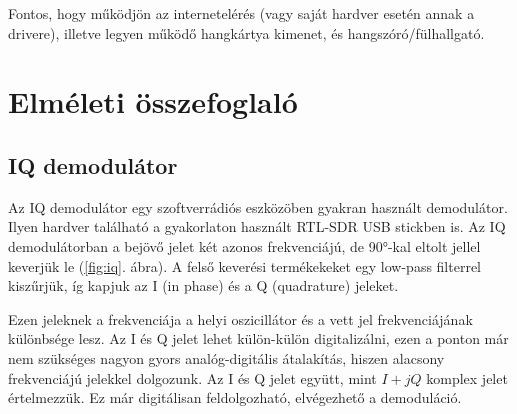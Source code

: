\documentclass[12pt,a4paper]{article}
\begin{document}
Fontos, hogy működjön az internetelérés (vagy saját hardver esetén annak a drivere), illetve legyen működő hangkártya kimenet, és hangszóró/fülhallgató.

\section{Elméleti összefoglaló}


\subsection{IQ demodulátor}
Az IQ demodulátor egy szoftverrádiós eszközöben gyakran használt demodulátor.
Ilyen hardver található a gyakorlaton használt RTL-SDR USB stickben is.
Az IQ demodulátorban a bejövő jelet két azonos frekvenciájú, de 90°-kal eltolt jellel keverjük le (\ref{fig:iq}. ábra). 
A felső keverési termékekeket egy low-pass filterrel kiszűrjük, íg kapjuk az I (in phase) és a Q (quadrature) jeleket.

Ezen jeleknek a frekvenciája a helyi oszicillátor és a vett jel frekvenciájának különbsége lesz.
Az I és Q jelet lehet külön-külön digitalizálni, ezen a ponton már nem szükséges nagyon gyors analóg-digitális átalakítás, hiszen alacsony frekvenciájú jelekkel dolgozunk. 
Az I és Q jelet együtt, mint $I + jQ$ komplex jelet értelmezzük.
Ez már digitálisan feldolgozható, elvégezhető a demoduláció. 
\end{document}
